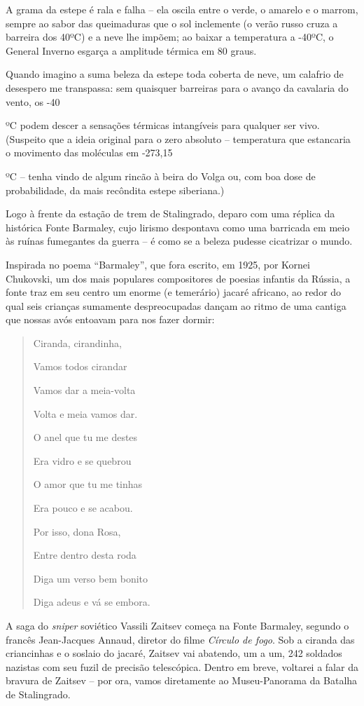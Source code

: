 A grama da estepe é rala e falha -- ela oscila entre o verde, o amarelo
e o marrom, sempre ao sabor das queimaduras que o sol inclemente (o
verão russo cruza a barreira dos 40ºC) e a neve lhe impõem; ao baixar a
temperatura a -40ºC, o General Inverno esgarça a amplitude térmica em 80
graus.

Quando imagino a suma beleza da estepe toda coberta de neve, um calafrio
de desespero me transpassa: sem quaisquer barreiras para o avanço da
cavalaria do vento, os -40

ºC podem descer a sensações térmicas intangíveis para qualquer ser vivo.
(Suspeito que a ideia original para o zero absoluto -- temperatura que
estancaria o movimento das moléculas em -273,15

ºC -- tenha vindo de algum rincão à beira do Volga ou, com boa dose de
probabilidade, da mais recôndita estepe siberiana.)

Logo à frente da estação de trem de Stalingrado, deparo com uma réplica
da histórica Fonte Barmaley, cujo lirismo despontava como uma barricada
em meio às ruínas fumegantes da guerra -- é como se a beleza pudesse
cicatrizar o mundo.

Inspirada no poema ``Barmaley'', que fora escrito, em 1925, por Kornei
Chukovski, um dos mais populares compositores de poesias infantis da
Rússia, a fonte traz em seu centro um enorme (e temerário) jacaré
africano, ao redor do qual seis crianças sumamente despreocupadas dançam
ao ritmo de uma cantiga que nossas avós entoavam para nos fazer dormir:

\begin{quote}
Ciranda, cirandinha,

Vamos todos cirandar

Vamos dar a meia-volta

Volta e meia vamos dar.

O anel que tu me destes

Era vidro e se quebrou

O amor que tu me tinhas

Era pouco e se acabou.

Por isso, dona Rosa,

Entre dentro desta roda

Diga um verso bem bonito

Diga adeus e vá se embora.
\end{quote}

A saga do \emph{sniper} soviético Vassili Zaitsev começa na Fonte
Barmaley, segundo o francês Jean-Jacques Annaud, diretor do filme
\emph{Círculo de fogo}. Sob a ciranda das criancinhas e o soslaio do
jacaré, Zaitsev vai abatendo, um a um, 242 soldados nazistas com seu
fuzil de precisão telescópica. Dentro em breve, voltarei a falar da
bravura de Zaitsev -- por ora, vamos diretamente ao Museu-Panorama da
Batalha de Stalingrado.

